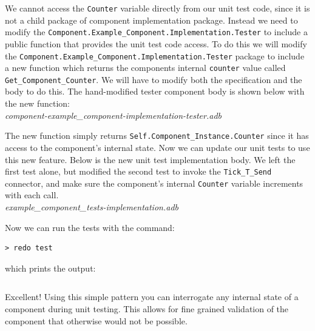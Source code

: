 We cannot access the \texttt{Counter} variable directly from our unit test code, since it is not a child package of component implementation package. Instead we need to modify the \texttt{Component.Example\_Component.Implementation.Tester} to include a public function that provides the unit test code access. To do this we will modify the \texttt{Component.Example\_Component.Implementation.Tester} package to include a new function which returns the components internal \texttt{counter} value called \texttt{Get\_Component\_Counter}. We will have to modify both the specification and the body to do this. The hand-modified tester component body is shown below with the new function: \\

\textit{component-example\_component-implementation-tester.adb}

The new function simply returns \texttt{Self.Component\_Instance.Counter} since it has access to the component's internal state. Now we can update our unit tests to use this new feature. Below is the new unit test implementation body. We left the first test alone, but modified the second test to invoke the \texttt{Tick\_T\_Send} connector, and make sure the component's internal \texttt{Counter} variable increments with each call. \\

\textit{example\_component\_tests-implementation.adb}

Now we can run the tests with the command:

\vspace{5mm} %
\begin{verbatim}
> redo test
\end{verbatim}
\vspace{5mm} %

which prints the output:

\vspace{5mm} %
\inputminted{text}{../example_architecture/example_component/test3/output.txt}
\vspace{5mm} %

Excellent! Using this simple pattern you can interrogate any internal state of a component during unit testing. This allows for fine grained validation of the component that otherwise would not be possible.

